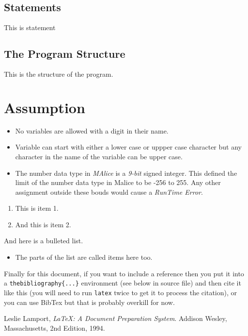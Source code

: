 \documentclass[a4wide, 11pt]{article}
\begin{document}
\subsection{Statements}
\label{sec:statements}
This is statement

\subsection{The Program Structure}
\label{sec:progStr}
This is the structure of the program.

\section{Assumption}
\label{sec:assumption}
\begin{itemize}
	\item No variables are allowed with a digit in their name.
	\item	Variable can start with either a lower case or uppper case character but any character
				in the name of the variable can be upper case.
	\item The number data type in \emph{MAlice} is a \emph{9-bit} signed integer.
				This defined the limit of the number data type in Malice to be -256 to 255.
				Any other assignment outside these bouds would cause a \emph{RunTime Error}.
\end{itemize}


\begin{enumerate}

    \item
    This is item 1.
    
    \item
    And this is item 2.
    
\end{enumerate}

And here is a bulleted list.

\begin{itemize}

    \item
    The parts of the list are called items here too.
    
\end{itemize}

Finally for this document, if you want to include a reference
then you put it into a \texttt{thebibliography\{...\}}
environment (see below in source file) and then 
cite it like this \cite{lamport94}
(you will need to run \texttt{latex} twice to get it to process the citation),
or you can use BibTex but that is probably overkill for now.

\begin{thebibliography}{9}

  Leslie Lamport,
  \emph{\LaTeX: A Document Preparation System}.
  Addison Wesley, Massachusetts,
  2nd Edition,
  1994.

\end{thebibliography}
\end{document}
